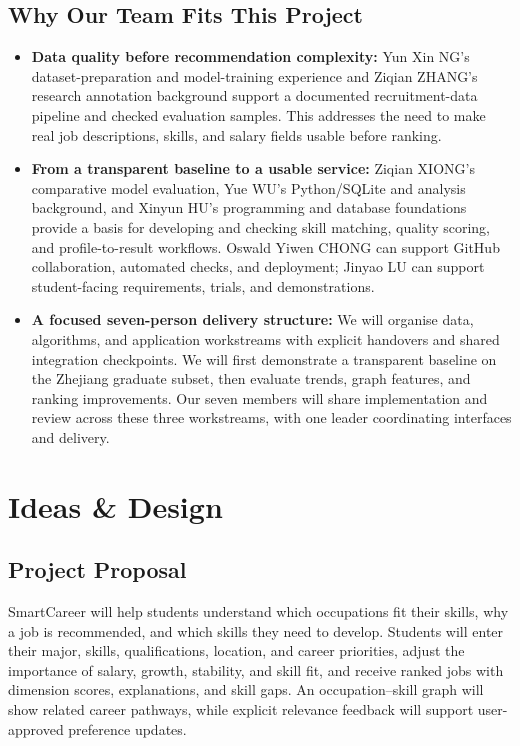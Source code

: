 \documentclass[a4paper,12pt]{article}
\begin{document}
\subsection{Why Our Team Fits This Project}
\begin{itemize}
  \item \textbf{Data quality before recommendation complexity:} Yun Xin NG's dataset-preparation and model-training experience and Ziqian ZHANG's research annotation background support a documented recruitment-data pipeline and checked evaluation samples. This addresses the need to make real job descriptions, skills, and salary fields usable before ranking.
  \item \textbf{From a transparent baseline to a usable service:} Ziqian XIONG's comparative model evaluation, Yue WU's Python/SQLite and analysis background, and Xinyun HU's programming and database foundations provide a basis for developing and checking skill matching, quality scoring, and profile-to-result workflows. Oswald Yiwen CHONG can support GitHub collaboration, automated checks, and deployment; Jinyao LU can support student-facing requirements, trials, and demonstrations.
  \item \textbf{A focused seven-person delivery structure:} We will organise data, algorithms, and application workstreams with explicit handovers and shared integration checkpoints. We will first demonstrate a transparent baseline on the Zhejiang graduate subset, then evaluate trends, graph features, and ranking improvements. Our seven members will share implementation and review across these three workstreams, with one leader coordinating interfaces and delivery.
\end{itemize}

\newpage

\section{Ideas \& Design}
\subsection{Project Proposal}
SmartCareer will help students understand which occupations fit their skills, why a job is recommended, and which skills they need to develop. Students will enter their major, skills, qualifications, location, and career priorities, adjust the importance of salary, growth, stability, and skill fit, and receive ranked jobs with dimension scores, explanations, and skill gaps. An occupation--skill graph will show related career pathways, while explicit relevance feedback will support user-approved preference updates.
\end{document}
